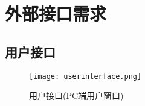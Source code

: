 \section{外部接口需求}
\subsection{用户接口}
\begin{figure}[ht]
	\centering
	\texttt{[image: userinterface.png]}\label{tab:classification}
	\caption{用户接口(PC端用户窗口)}\label{fig:noted-figure}
\end{figure}

